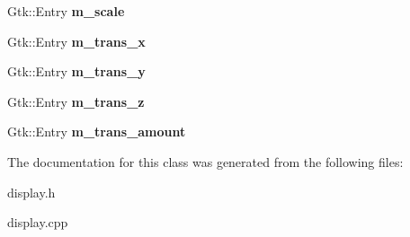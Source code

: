 \begin{DoxyCompactItemize}
\item 
Gtk\+::\+Entry {\bfseries m\+\_\+scale}\hypertarget{classInput2dWindow_a1aea837cc394544fcc67047e46c3383a}{}\label{classInput2dWindow_a1aea837cc394544fcc67047e46c3383a}

\item 
Gtk\+::\+Entry {\bfseries m\+\_\+trans\+\_\+x}\hypertarget{classInput2dWindow_abed706695b9f0acb22731918dde7de31}{}\label{classInput2dWindow_abed706695b9f0acb22731918dde7de31}

\item 
Gtk\+::\+Entry {\bfseries m\+\_\+trans\+\_\+y}\hypertarget{classInput2dWindow_a2b786777b7d43a86d76f1aa57b587f26}{}\label{classInput2dWindow_a2b786777b7d43a86d76f1aa57b587f26}

\item 
Gtk\+::\+Entry {\bfseries m\+\_\+trans\+\_\+z}\hypertarget{classInput2dWindow_a34e2c9b08ec2689612ae5e8a12abbe74}{}\label{classInput2dWindow_a34e2c9b08ec2689612ae5e8a12abbe74}

\item 
Gtk\+::\+Entry {\bfseries m\+\_\+trans\+\_\+amount}\hypertarget{classInput2dWindow_adfb4ddb2864e73385b1698d4e24401f6}{}\label{classInput2dWindow_adfb4ddb2864e73385b1698d4e24401f6}

\end{DoxyCompactItemize}


The documentation for this class was generated from the following files\+:\begin{DoxyCompactItemize}
\item 
display.\+h\item 
display.\+cpp\end{DoxyCompactItemize}
